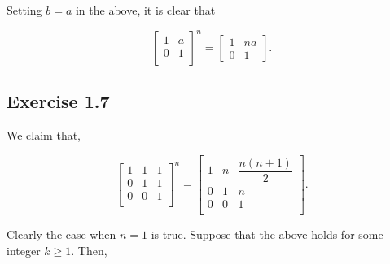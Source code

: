 \documentclass{article}
\begin{document}
Setting $b=a$ in the above, it is clear that

\[
    \begin{bmatrix}
    1 & a\\
    0 & 1\\
    \end{bmatrix}^n
    =
    \begin{bmatrix}
    1 & na\\
    0 & 1
    \end{bmatrix}.
\]

\subsection*{Exercise 1.7}

We claim that,

\[
    \begin{bmatrix}
    1 & 1 & 1\\
    0 & 1 & 1\\
    0 & 0 & 1\\
    \end{bmatrix}^n
    =
    \begin{bmatrix}
    1 & n & \dfrac{n(n+1)}{2}\\
    0 & 1 & n\\
    0 & 0 & 1\\
    \end{bmatrix}.
\]

Clearly the case when $n=1$ is true. Suppose that the above holds for some integer $k\geq 1$. Then,
\end{document}
